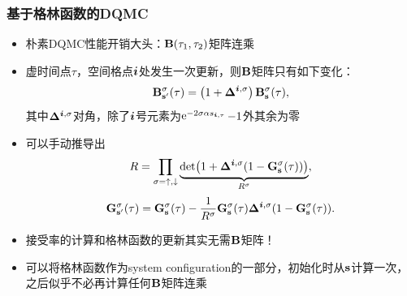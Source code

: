 \documentclass[UTF8]{ctexbeamer}
\DeclareMathOperator{\ee}{e}
\begin{document}
\begin{frame}
\frametitle{基于格林函数的DQMC}

\begin{itemize}
    \item 朴素DQMC性能开销大头：$\vb{B}(\tau_1, \tau_2)$矩阵连乘
    \item 虚时间点$\tau$，空间格点$\vb*{i}$处发生一次更新，则$\vb{B}$矩阵只有如下变化：
    \begin{equation}
        \mathbf{B}^\sigma_{\mathbf{s}^{\prime}}(\tau)=\left(1+\vb{\Delta}^{\vb*{i}, \sigma}\right) \mathbf{B}^\sigma_{\mathbf{s}}(\tau),
    \end{equation}
    其中$\vb{\Delta}^{\vb*{i}, \sigma}$对角，除了$\vb*{i}$号元素为$\ee^{-2 \sigma \alpha s_{\vb*{i}, \tau}} - 1$外其余为零
    \item 可以手动推导出
    \begin{equation}
        R = \prod_{\sigma = \uparrow, \downarrow} \underbrace{\det(1 + \vb{\Delta}^{\vb*{i}, \sigma} (1 - \vb{G}^\sigma_{\vb{s}}(\tau)))}_{R^\sigma},
        \label{eq:accept-rate}
    \end{equation}   
    \begin{equation}
        \vb{G}^\sigma_{\vb{s}'}(\tau) = \vb{G}^\sigma_{\vb{s}}(\tau) - \frac{1}{R^\sigma} \vb{G}^\sigma_{\vb{s}}(\tau) \vb{\Delta}^{\vb*{i}, \sigma} (1 - \vb{G}^\sigma_{\vb{s}}(\tau)).
        \label{eq:green-function-update}
    \end{equation}
    \item 接受率的计算和格林函数的更新其实无需$\vb{B}$矩阵！
    \item 可以将格林函数作为system configuration的一部分，初始化时从$\vb{s}$计算一次，之后似乎不必再计算任何$\vb{B}$矩阵连乘
\end{itemize}

\end{frame}
\end{document}
